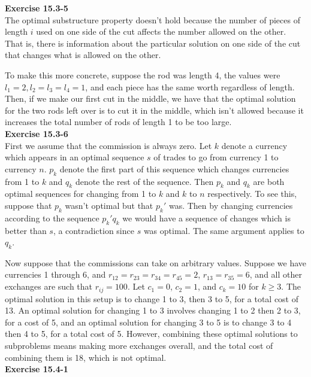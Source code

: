 \documentclass{article}
\begin{document}
\noindent\textbf{Exercise 15.3-5}\\

The optimal substructure property doesn't hold because the number of pieces of length $i$ used on one side of the cut affects the number allowed on the other. That is, there is information about the particular solution on one side of the cut that changes what is allowed on the other.

To make this more concrete, suppose the rod was length 4, the values were $l_1 = 2, l_2 = l_3= l_4 =1$, and each piece has the same worth regardless of length. Then, if we make our first cut in the middle, we have that the optimal solution for the two rods left over is to cut it in the middle, which isn't allowed because it increases the total number of rods of length 1 to be too large.\\

\noindent\textbf{Exercise 15.3-6}\\

First we assume that the commission is always zero.  Let $k$ denote a currency which appears in an optimal sequence $s$ of trades to go from currency 1 to currency $n$.  $p_k$ denote the first part of this sequence which changes currencies from 1 to $k$ and $q_k$ denote the rest of the sequence.  Then $p_k$ and $q_k$ are both optimal sequences for changing from 1 to $k$ and $k$ to $n$ respectively.  To see this, suppose that $p_k$ wasn't optimal but that $p_k'$ was.  Then by changing currencies according to the sequence $p_k' q_k$ we would have a sequence of changes which is better than $s$, a contradiction since $s$ was optimal.  The same argument applies to $q_k$.

Now suppose that the commissions can take on arbitrary values.  Suppose we have currencies 1 through 6, and $r_{12} = r_{23} = r_{34} = r_{45} = 2$, $r_{13} = r_{35} = 6$, and all other exchanges are such that $r_{ij} = 100$.  Let $c_1 = 0$, $c_2 = 1$, and $c_k = 10$ for $k \geq 3$.  The optimal solution in this setup is to change 1 to 3, then 3 to 5, for a total cost of 13.  An optimal solution for changing 1 to 3 involves changing 1 to 2 then 2 to 3, for a cost of 5, and an optimal solution for changing 3 to 5 is to change 3 to 4 then 4 to 5, for a total cost of 5.  However, combining these optimal solutions to subproblems means making more exchanges overall, and the total cost of combining them is 18, which is not optimal. \\

\noindent\textbf{Exercise 15.4-1}\\
\end{document}
